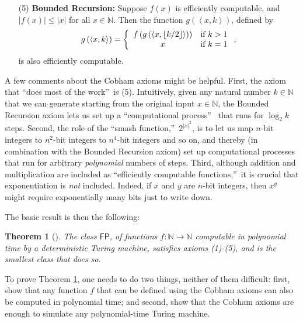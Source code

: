\documentclass[12pt,onecolumn]{article}%
\newtheorem{theorem}{Theorem}
\begin{document}
\begin{enumerate}
\item[(5)] \textbf{Bounded Recursion:} Suppose $f(x)  $ is
efficiently computable, and $\left\vert f(x)  \right\vert
\leq\left\vert x\right\vert $ for all $x\in\mathbb{N}$. Then the function
$g\left(  \left\langle x,k\right\rangle \right)  $, defined by%
\[
g\left(  \left\langle x,k\right\rangle \right)  =\left\{
\begin{array}
[c]{cc}%
f\left(  g\left(  \left\langle x,\left\lfloor k/2\right\rfloor \right\rangle
\right)  \right)  & \text{if }k>1\\
x & \text{if }k=1
\end{array}
\right.  ,
\]
is also efficiently computable.
\end{enumerate}

A few comments about the Cobham axioms might be helpful. First, the axiom
that \textquotedblleft does most of the work\textquotedblright\  is (5).
 Intuitively, given any natural number $k\in\mathbb{N}$ that we can generate
starting from the original input $x\in\mathbb{N}$, the Bounded Recursion axiom
lets us set up a \textquotedblleft computational process\textquotedblright\ %
 that runs for $\log_{2}k$ steps. Second, the role of the
\textquotedblleft smash function,\textquotedblright\  $2^{\left\vert
x\right\vert ^{2}}$, is to let us map $n$-bit integers to $n^{2}$-bit integers
to $n^{4}$-bit integers and so on, and thereby (in combination with the
Bounded Recursion axiom) set up computational processes that run for arbitrary
\textit{polynomial} numbers of steps. Third, although addition and
multiplication are included as \textquotedblleft efficiently computable
functions,\textquotedblright\  it is crucial that exponentiation is
\textit{not} included. Indeed, if $x$ and $y$ are $n$-bit integers, then
$x^{y}$ might require exponentially many bits just to write down.

The basic result is then the following:

\begin{theorem}
[\cite{cobham,rose}]\label{cobhamthm}The class $\mathsf{FP}$, of functions
$f:\mathbb{N}\rightarrow\mathbb{N}$ computable in polynomial time by a
deterministic Turing machine, satisfies axioms (1)-(5), and is the smallest
class that does so.
\end{theorem}

To prove Theorem \ref{cobhamthm}, one needs to do two things, neither of them
difficult: first, show that any function $f$ that can be defined using the
Cobham axioms can also be computed in polynomial time; and second, show that
the Cobham axioms are enough to simulate any polynomial-time Turing machine.
\end{document}
